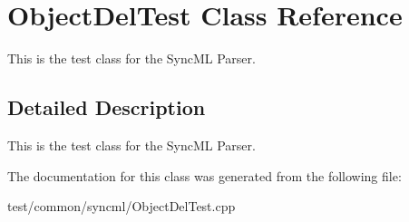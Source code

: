 \section{Object\-Del\-Test Class Reference}
\label{classObjectDelTest}
This is the test class for the Sync\-ML Parser.  




\subsection{Detailed Description}
This is the test class for the Sync\-ML Parser. 



The documentation for this class was generated from the following file:\begin{CompactItemize}
\item 
test/common/syncml/Object\-Del\-Test.cpp\end{CompactItemize}
